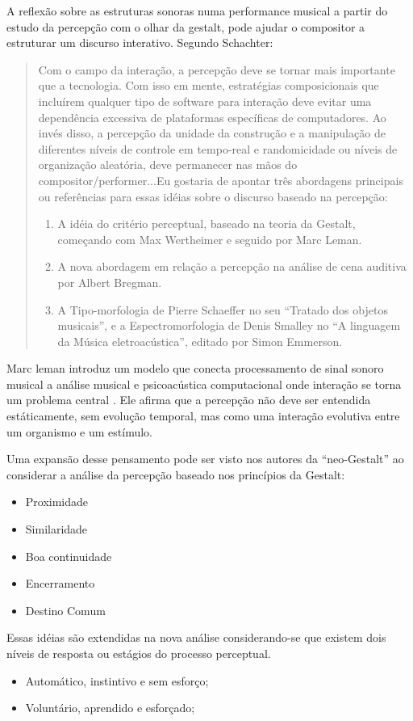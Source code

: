 \documentclass{ppgmus}
\begin{document}
A reflexão sobre as estruturas sonoras numa performance musical a partir do estudo
da percepção com o olhar da gestalt, pode ajudar o compositor a estruturar um 
discurso interativo. Segundo Schachter:
\begin{quote}
 Com o campo da interação, a percepção deve se tornar mais importante que a tecnologia.
Com isso em mente, estratégias composicionais que incluírem qualquer tipo de software
 para interação deve evitar uma dependência excessiva de plataformas específicas de 
computadores. Ao invés disso, a percepção da unidade da construção e a manipulação de
diferentes níveis de controle em tempo-real e randomicidade ou níveis de organização
aleatória, deve permanecer nas mãos do compositor/performer...Eu gostaria de apontar
três abordagens principais ou referências para essas idéias sobre o discurso baseado
na percepção:
\begin{enumerate}
 \item A idéia do critério perceptual, baseado na teoria da Gestalt, começando com
Max Wertheimer e seguido por Marc Leman.
  \item A nova abordagem em relação a percepção na análise de cena auditiva por Albert
Bregman.
  \item A Tipo-morfologia de Pierre Schaeffer no seu ``Tratado dos objetos musicais'',
e a Espectromorfologia de Denis Smalley no ``A linguagem da Música eletroacústica'', editado
por Simon Emmerson.
\cite{schachter07:discourse}
\end{enumerate}
\end{quote} 


Marc leman introduz um modelo que conecta processamento de 
sinal sonoro musical a análise musical e psicoacústica computacional onde interação
se torna um problema central \cite{leman96:gestalt}. Ele afirma que a percepção não deve ser entendida estáticamente,
sem evolução temporal, mas como uma interação evolutiva entre um organismo e um estímulo.

Uma expansão desse pensamento pode ser visto nos autores da ``neo-Gestalt'' ao considerar
a análise da percepção baseado nos princípios da Gestalt:
\begin{itemize}
 \item Proximidade
  \item Similaridade
  \item Boa continuidade
  \item Encerramento
  \item Destino Comum
\end{itemize}
Essas idéias são extendidas na nova análise considerando-se que existem dois níveis de
resposta ou estágios do processo perceptual.
\begin{itemize}
 \item Automático, instintivo e sem esforço;
  \item Voluntário, aprendido e esforçado;
\end{itemize}
\end{document}
